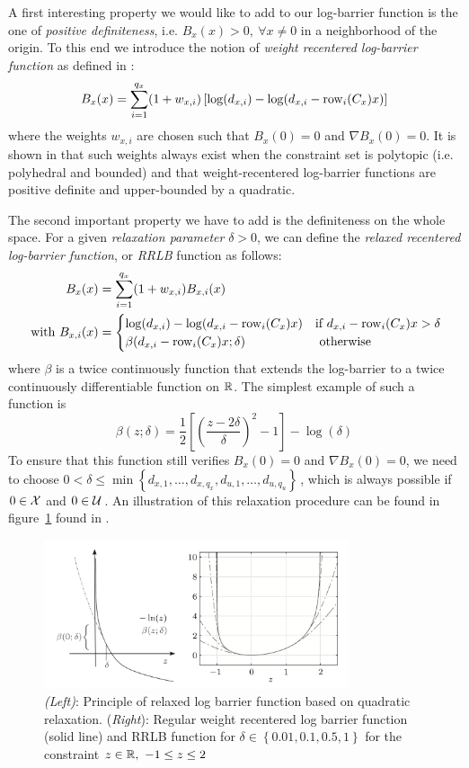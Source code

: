 \documentclass[12pt]{article}
\begin{document}
A first interesting property we would like to add to our log-barrier function is the one of \textit{positive definiteness}, i.e. $B_x(x)>0,~\forall x\neq 0$ in a neighborhood of the origin.
To this end we introduce the notion of \textit{weight recentered log-barrier function} as defined in \cite{RLB}:
$$B_x(x)=\sum_{i=1}^{q_x}(1+w_{x,i})\left[\log(d_{x,i})-\log(d_{x,i}-\rm{row}_i(C_x)x)\right]$$
where the weights $w_{x,i}$ are chosen such that $B_x(0)=0$ and $\nabla B_x(0)=0$.
It is shown in \cite{RLB} that such weights always exist when the constraint set is polytopic (i.e. polyhedral and bounded) and that weight-recentered log-barrier functions are positive definite and upper-bounded by a quadratic.

The second important property we have to add is the definiteness on the whole space.
For a given \textit{relaxation parameter} $\delta>0$, we can define the \textit{relaxed recentered log-barrier function}, or \textit{RRLB} function as follows:
\begin{align*}
	B_x(x)&=\sum_{i=1}^{q_x}(1+w_{x,i})B_{x,i}(x)\\
	\text{ with }B_{x,i}(x)&=\begin{cases}
		\log(d_{x,i})-\log(d_{x,i}-\rm{row}_i(C_x)x)&\text{if }d_{x,i}-\rm{row}_i(C_x)x>\delta\\
		\beta(d_{x,i}-\rm{row}_i(C_x)x;\delta)&\text{ otherwise}
	\end{cases}
\end{align*}
where $\beta$ is a twice continuously function that extends the log-barrier to a twice continuously differentiable function on $\R$.
The simplest example of such a function is
$$\beta(z;\delta)=\frac{1}{2}\left[ \left( \frac{z-2\delta}{\delta} \right)^2-1 \right]-\log(\delta)$$
To ensure that this function still verifies $B_x(0)=0$ and $\nabla B_x(0)=0$, we need to choose $0<\delta\leq\min\left\{d_{x,1},\ldots,d_{x,q_x},d_{u,1},\ldots,d_{u,q_u}\right\}$\,, which is always possible if $0\in\cal{X}$ and $0\in\cal{U}$\,.
An illustration of this relaxation procedure can be found in figure~\ref{fig:RRLB-functions} found in \cite{rti-diehl}.

\begin{figure}
	\centering
	\includegraphics[width=0.8\textwidth]{images/rrlb-functions.png}
	\caption{\textit{(Left)}: Principle of relaxed log barrier function based on quadratic relaxation. (\textit{Right}): Regular weight recentered log barrier function (solid line) and RRLB function for $\delta\in\left\{ 0.01,0.1,0.5,1 \right\}$ for the constraint $z\in\R,~-1\leq z\leq 2$}
	\label{fig:RRLB-functions}
\end{figure}
\end{document}
